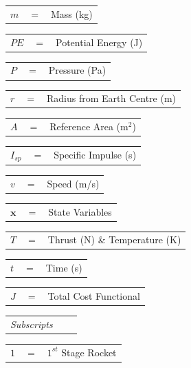 \begin{tabular}{p{0.8cm}p{0.8cm}p{5.6cm}}
	$m$ & $=$ & Mass (kg)\\
\end{tabular} 
\begin{tabular}{p{0.8cm}p{0.8cm}p{5.6cm}}
	$PE$ & $=$ & Potential Energy (J)\\
\end{tabular} 
\begin{tabular}{p{0.8cm}p{0.8cm}p{5.6cm}}
	$P$ & $=$ & Pressure (Pa)  \\
\end{tabular}
\begin{tabular}{p{0.8cm}p{0.8cm}p{5.6cm}}
	$r$ & $=$ & Radius from Earth Centre (m)\\
\end{tabular} 
\begin{tabular}{p{0.8cm}p{0.8cm}p{5.6cm}}
	$A$ & $=$ & Reference Area (m$^2$)\\
\end{tabular} 
\begin{tabular}{p{0.8cm}p{0.8cm}p{5.6cm}}
	$I_{sp}$ & $=$ & Specific Impulse (s)\\ 
\end{tabular} 
\begin{tabular}{p{0.8cm}p{0.8cm}p{5.6cm}}
	$v$ & $=$ & Speed (m/s)\\
\end{tabular} 
\begin{tabular}{p{0.8cm}p{0.8cm}p{5.6cm}}
	$\textbf{x}$& $=$ & State Variables\\
\end{tabular} 
\begin{tabular}{p{0.8cm}p{0.8cm}p{5.6cm}}
	$T$ & $=$ & Thrust (N) \& Temperature (K)\\
\end{tabular} 
\begin{tabular}{p{0.8cm}p{0.8cm}p{5.6cm}}
	$t$ & $=$ & Time (s)\\
\end{tabular} 
\begin{tabular}{p{0.8cm}p{0.8cm}p{5.6cm}}
	$J$ & $=$ & Total Cost Functional\\
\end{tabular}
\newline  	
\begin{tabular}{p{5.2cm}p{1cm}p{10cm}}
	\textit{Subscripts} & & \\
\end{tabular} 
\begin{tabular}{p{0.8cm}p{0.8cm}p{5.6cm}}
	$1$ & $=$ & $1^{st}$ Stage Rocket\\
\end{tabular} 
